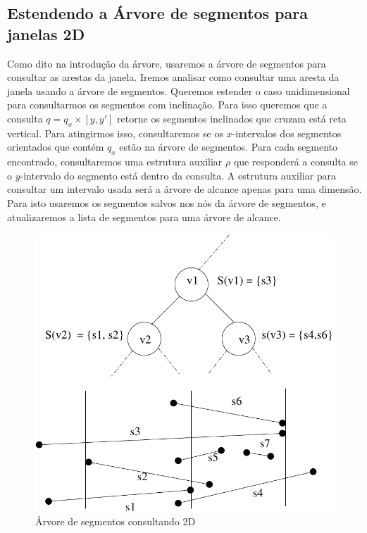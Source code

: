 \subsection{Estendendo a Árvore de segmentos para janelas 2D}
Como dito na introdução da árvore, usaremos a árvore de segmentos para consultar as arestas da janela. Iremos analisar como consultar uma aresta da janela usando a árvore de segmentos. Queremos estender o caso unidimensional para consultarmos os segmentos com inclinação. Para isso queremos que a consulta $q = q_x \times [y, y']$ retorne os segmentos inclinados que cruzam está reta vertical. Para atingirmos isso, consultaremos se os $x$-intervalos dos segmentos orientados que contém $q_x$ estão na árvore de segmentos. Para cada segmento encontrado, consultaremos uma estrutura auxiliar $\rho$ que responderá a consulta se o $y$-intervalo do segmento está dentro da consulta. A estrutura auxiliar para consultar um intervalo usada será a árvore de alcance apenas para uma dimensão. Para isto usaremos os segmentos salvos nos nós da árvore de segmentos, e atualizaremos a lista de segmentos para uma árvore de alcance.

\begin{figure}[h!]
    \centering
    \includegraphics[scale=0.7]{images/segmentos_2d.pdf}
    \caption{Árvore de segmentos consultando 2D }
    \label{fig:my_label}
\end{figure}

